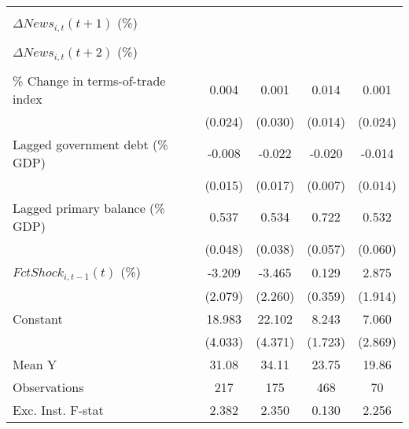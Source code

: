 {\begin{tabular}{l*{4}{c}}
                    &                     &                     &                     &                     \\
\addlinespace
$ \Delta News_{i,t}(t+1)$ (\%)&                     &                     &                     &                     \\
                    &                     &                     &                     &                     \\
\addlinespace
$ \Delta News_{i,t}(t+2)$ (\%)&                     &                     &                     &                     \\
                    &                     &                     &                     &                     \\
\addlinespace
\% Change in terms-of-trade index&       0.004         &       0.001         &       0.014         &       0.001         \\
                    &     (0.024)         &     (0.030)         &     (0.014)         &     (0.024)         \\
\addlinespace
Lagged government debt (\% GDP)&      -0.008         &      -0.022         &      -0.020\sym{***}&      -0.014         \\
                    &     (0.015)         &     (0.017)         &     (0.007)         &     (0.014)         \\
\addlinespace
Lagged primary balance (\% GDP)&       0.537\sym{***}&       0.534\sym{***}&       0.722\sym{***}&       0.532\sym{***}\\
                    &     (0.048)         &     (0.038)         &     (0.057)         &     (0.060)         \\
\addlinespace
$ FctShock_{i,t-1}(t)$ (\%)&      -3.209         &      -3.465         &       0.129         &       2.875         \\
                    &     (2.079)         &     (2.260)         &     (0.359)         &     (1.914)         \\
\addlinespace
Constant            &      18.983\sym{***}&      22.102\sym{***}&       8.243\sym{***}&       7.060\sym{**} \\
                    &     (4.033)         &     (4.371)         &     (1.723)         &     (2.869)         \\
\midrule
Mean Y              &       31.08         &       34.11         &       23.75         &       19.86         \\
Observations        &         217         &         175         &         468         &          70         \\
Exc. Inst. F-stat   &       2.382         &       2.350         &       0.130         &       2.256         \\
\bottomrule
\end{tabular}
}
